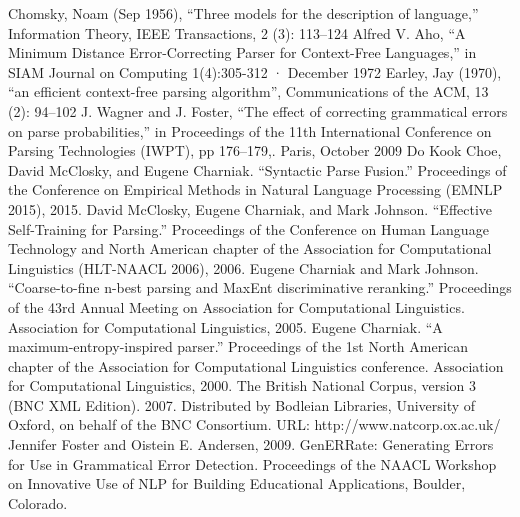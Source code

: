 \documentclass[conference]{IEEEtran}
\begin{document}
\begin{thebibliography}{00}
 Chomsky, Noam (Sep 1956), ``Three models for the description of language,'' Information Theory, IEEE Transactions, 2 (3): 113--124
 Alfred V. Aho, ``A Minimum Distance Error-Correcting Parser for Context-Free Languages,'' in SIAM Journal on Computing 1(4):305-312 · December 1972
Earley, Jay (1970), ``an efficient context-free parsing algorithm'', Communications of the ACM, 13 (2): 94--102
 J. Wagner and J. Foster, ``The effect of correcting grammatical errors on parse probabilities,'' in Proceedings of the 11th International Conference on Parsing Technologies (IWPT), pp 176--179,. Paris, October 2009
 Do Kook Choe, David McClosky, and Eugene Charniak. ``Syntactic Parse Fusion.'' Proceedings of the Conference on Empirical Methods in Natural Language Processing (EMNLP 2015), 2015.
 David McClosky, Eugene Charniak, and Mark Johnson. ``Effective Self-Training for Parsing.'' Proceedings of the Conference on Human Language Technology and North American chapter of the Association for Computational Linguistics (HLT-NAACL 2006), 2006.
 Eugene Charniak and Mark Johnson. ``Coarse-to-fine n-best parsing and MaxEnt discriminative reranking.'' Proceedings of the 43rd Annual Meeting on Association for Computational Linguistics. Association for Computational Linguistics, 2005.
 Eugene Charniak. ``A maximum-entropy-inspired parser.'' Proceedings of the 1st North American chapter of the Association for Computational Linguistics conference. Association for Computational Linguistics, 2000.
 The British National Corpus, version 3 (BNC XML Edition). 2007. Distributed by Bodleian Libraries, University of Oxford, on behalf of the BNC Consortium. URL: http://www.natcorp.ox.ac.uk/
 Jennifer Foster and Oistein E. Andersen, 2009. GenERRate: Generating Errors for Use in Grammatical Error Detection. Proceedings of the NAACL Workshop on Innovative Use of NLP for Building Educational Applications, Boulder, Colorado.
\end{thebibliography}
\end{document}

